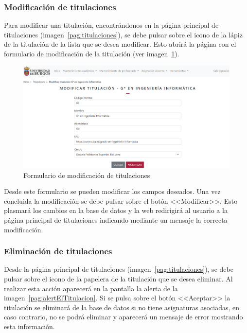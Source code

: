 \subsubsection{Modificación de titulaciones}
Para modificar una titulación, encontrándonos en la página principal de titulaciones (imagen~\ref{pag:titulaciones}), se debe pulsar sobre el icono de la lápiz de la titulación de la lista que se desea modificar.
Esto abrirá la página con el formulario de modificación de la titulación (ver imagen~\ref{pag:formModTitulacion}).

\begin{figure}
	\centering
	\includegraphics[width=\textwidth]{../img/Anexos/Manual usuario/formModTitulacion.png}
	\caption{Formulario de modificación de titulaciones}\label{pag:formModTitulacion}
\end{figure}

Desde este formulario se pueden modificar los campos deseados.
Una vez concluida la modificación se debe pulsar sobre el botón <<Modificar>>.
Esto plasmará los cambios en la base de datos y la web redirigirá al usuario a la página principal de titulaciones indicando mediante un mensaje la correcta modificación.

\subsubsection{Eliminación de titulaciones}
Desde la página principal de titulaciones (imagen~\ref{pag:titulaciones}), se debe pulsar sobre el icono de la papelera de la titulación que se desea eliminar.
Al realizar esta acción aparecerá en la pantalla la alerta de la imagen~\ref{pag:alertElTitulacion}. Si se pulsa sobre el botón <<Aceptar>> la titulación se eliminará de la base de datos si no tiene asignaturas asociadas, en caso contrario, no se podrá eliminar y aparecerá un mensaje de error mostrando esta información.

